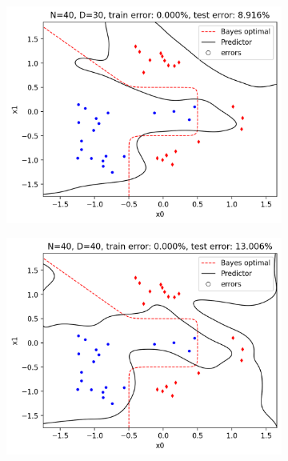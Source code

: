 \documentclass[a4paper,11pt]{article}
\begin{document}
\begin{figure}[ht]
\begin{subfigure}[b]{0.3\textwidth}
        \includegraphics[width=\textwidth]{../boundary/30.png}
    \end{subfigure}
    \begin{subfigure}[b]{0.3\textwidth}
        \includegraphics[width=\textwidth]{../boundary/40.png}
    \end{subfigure}
    \hfill
    \begin{subfigure}[b]{0.3\textwidth}

\end{subfigure}
\end{figure}
\end{document}
